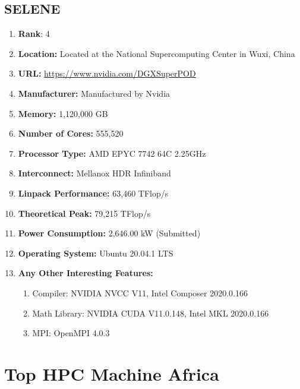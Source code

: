 \documentclass[12pt, a4paper, fleqn, titlepage]{article}
\begin{document}
    \subsection{SELENE}
        \begin{flushleft}
            \begin{enumerate}[\textbullet]
                \item \textbf{Rank}: 4
                \item \textbf{Location:} 
                    Located at the National Supercomputing Center in Wuxi, China
                \item \textbf{URL:} 
                    \url{https://www.nvidia.com/DGXSuperPOD}
                \item \textbf{Manufacturer:} Manufactured by Nvidia
                \item \textbf{Memory:} 1,120,000 GB
                \item \textbf{Number of Cores:} 555,520
                \item \textbf{Processor Type:} AMD EPYC 7742 64C 2.25GHz
                \item \textbf{Interconnect:} Mellanox HDR Infiniband
                \item \textbf{Linpack Performance:} 63,460 TFlop/s
                \item \textbf{Theoretical Peak:} 79,215  TFlop/s
                \item \textbf{Power Consumption:} 2,646.00  kW (Submitted)
                \item \textbf{Operating System:} Ubuntu 20.04.1 LTS
                \item \textbf{Any Other Interesting Features:}
                    \begin{enumerate}
                        \item Compiler: NVIDIA NVCC V11, Intel Composer 2020.0.166
                        \item Math Library: NVIDIA CUDA V11.0.148, Intel MKL 2020.0.166
                        \item MPI: OpenMPI 4.0.3
                    \end{enumerate}
            \end{enumerate}
        \end{flushleft}


\section{Top HPC Machine Africa}
\end{document}
